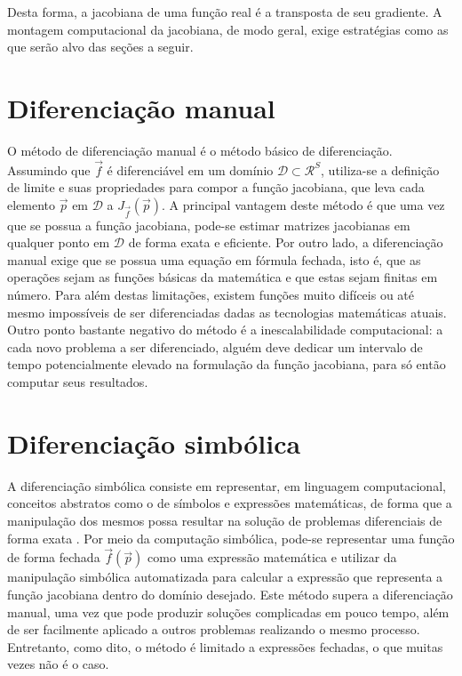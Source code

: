   Desta forma, a jacobiana de uma função real é a transposta de seu gradiente. A montagem computacional da jacobiana, de modo geral, exige estratégias como as que serão alvo das seções a seguir.

  \section{Diferenciação manual}

    O método de diferenciação manual é o método básico de diferenciação. Assumindo que $\vec{f}$ é diferenciável em um domínio $\mathcal{D} \subset \mathcal{R}^S$, utiliza-se a definição de limite e suas propriedades para compor a função jacobiana, que leva cada elemento $\vec{p}$ em $\mathcal{D}$ a $J_{\vec{f}}(\vec{p})$. A principal vantagem deste método é que uma vez que se possua a função jacobiana, pode-se estimar matrizes jacobianas em qualquer ponto em $\mathcal{D}$ de forma exata e eficiente. Por outro lado, a diferenciação manual exige que se possua uma equação em fórmula fechada, isto é, que as operações sejam as funções básicas da matemática e que estas sejam finitas em número. Para além destas limitações, existem funções muito difíceis ou até mesmo impossíveis de ser diferenciadas dadas as tecnologias matemáticas atuais. Outro ponto bastante negativo do método é a inescalabilidade computacional: a cada novo problema a ser diferenciado, alguém deve dedicar um intervalo de tempo potencialmente elevado na formulação da função jacobiana, para só então computar seus resultados.

  \section{Diferenciação simbólica}

    A diferenciação simbólica consiste em representar, em linguagem computacional, conceitos abstratos como o de símbolos e expressões matemáticas, de forma que a manipulação dos mesmos possa resultar na solução de problemas diferenciais de forma exata . Por meio da computação simbólica, pode-se representar uma função de forma fechada $\vec{f}(\vec{p})$ como uma expressão matemática e utilizar da manipulação simbólica automatizada para calcular a expressão que representa a função jacobiana dentro do domínio desejado. Este método supera a diferenciação manual, uma vez que pode produzir soluções complicadas em pouco tempo, além de ser facilmente aplicado a outros problemas realizando o mesmo processo. Entretanto, como dito, o método é limitado a expressões fechadas, o que muitas vezes não é o caso.

